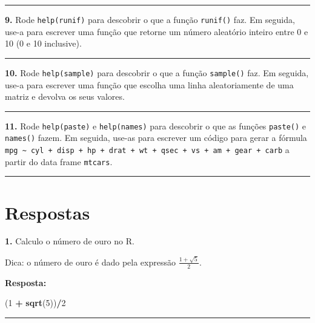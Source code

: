 \documentclass[]{book}
\newenvironment{Shaded}{\begin{snugshade}}{\end{snugshade}}
\newcommand{\DecValTok}[1]{\textcolor[rgb]{0.00,0.00,0.81}{#1}}
\newcommand{\KeywordTok}[1]{\textcolor[rgb]{0.13,0.29,0.53}{\textbf{#1}}}
\newcommand{\NormalTok}[1]{#1}
\newcommand{\OperatorTok}[1]{\textcolor[rgb]{0.81,0.36,0.00}{\textbf{#1}}}
\newcommand{\StringTok}[1]{\textcolor[rgb]{0.31,0.60,0.02}{#1}}
\begin{document}
\begin{center}\rule{0.5\linewidth}{\linethickness}\end{center}

\textbf{9.} Rode \texttt{help(runif)} para descobrir o que a função \texttt{runif()} faz. Em seguida, use-a para escrever uma função que retorne um número aleatório inteiro entre 0 e 10 (0 e 10 inclusive).

\begin{center}\rule{0.5\linewidth}{\linethickness}\end{center}

\textbf{10.} Rode \texttt{help(sample)} para descobrir o que a função \texttt{sample()} faz. Em seguida, use-a para escrever uma função que escolha uma linha aleatoriamente de uma matriz e devolva os seus valores.

\begin{center}\rule{0.5\linewidth}{\linethickness}\end{center}

\textbf{11.} Rode \texttt{help(paste)} e \texttt{help(names)} para descobrir o que as funções \texttt{paste()} e \texttt{names()} fazem. Em seguida, use-as para escrever um código para gerar a fórmula \texttt{mpg\ \textasciitilde{}\ cyl\ +\ disp\ +\ hp\ +\ drat\ +\ wt\ +\ qsec\ +\ vs\ +\ am\ +\ gear\ +\ carb} a partir do data frame \texttt{mtcars}.

\begin{center}\rule{0.5\linewidth}{\linethickness}\end{center}

\hypertarget{respostas}{%
\section{Respostas}\label{respostas}}

\textbf{1.} Calculo o número de ouro no R.

Dica: o número de ouro é dado pela expressão \(\frac{1 + \sqrt{5}}{2}\).

\textbf{Resposta:}

\begin{Shaded}
\begin{Highlighting}[]
\NormalTok{(}\DecValTok{1} \OperatorTok{+}\StringTok{ }\KeywordTok{sqrt}\NormalTok{(}\DecValTok{5}\NormalTok{))}\OperatorTok{/}\DecValTok{2}
\end{Highlighting}
\end{Shaded}

\begin{center}\rule{0.5\linewidth}{\linethickness}\end{center}
\end{document}
